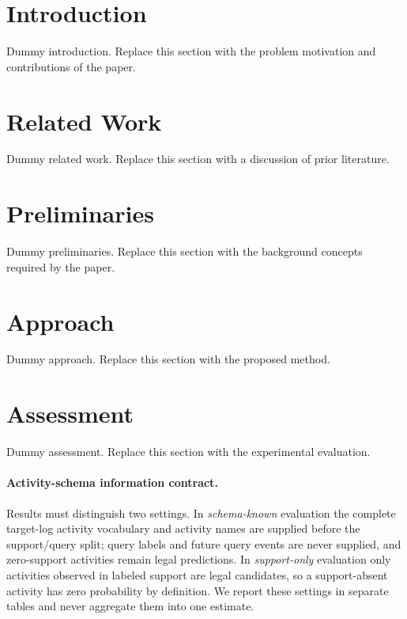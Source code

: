 \documentclass[electronics,article,submit,moreauthors]{Definitions/mdpi}
\begin{document}
\section{Introduction}\label{sec:introduction}

Dummy introduction. Replace this section with the problem motivation and contributions of the paper.

\section{Related Work}\label{sec:related}

Dummy related work. Replace this section with a discussion of prior literature.

\section{Preliminaries}\label{sec:preliminaries}

Dummy preliminaries. Replace this section with the background concepts required by the paper.

\section{Approach}\label{sec:approach}

Dummy approach. Replace this section with the proposed method.

\section{Assessment}\label{sec:assessment}

Dummy assessment. Replace this section with the experimental evaluation.

\paragraph{Activity-schema information contract.}
Results must distinguish two settings. In \emph{schema-known} evaluation the
complete target-log activity vocabulary and activity names are supplied before
the support/query split; query labels and future query events are never
supplied, and zero-support activities remain legal predictions. In
\emph{support-only} evaluation only activities observed in labeled support are
legal candidates, so a support-absent activity has zero probability by
definition. We report these settings in separate tables and never aggregate
them into one estimate.
\end{document}
